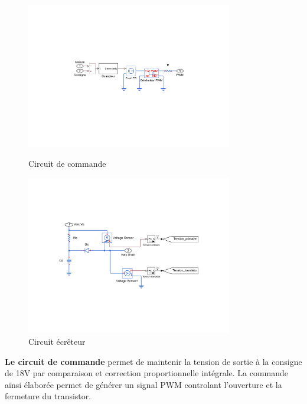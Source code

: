 \documentclass[12pt]{article}
\begin{document}
\vspace{10pt}
\begin{figure}[!h]
  \hspace{-30pt}
  \vspace{-30pt}
  \begin{minipage}[b]{0.45\linewidth}
   \centering
   \includegraphics[width=9cm,trim=6cm 7cm 6cm 7cm, clip=true]{Images_rapport/commande}  
   \caption{Circuit de commande}   
  \end{minipage}
\hfill
  \begin{minipage}[b]{0.45\linewidth}
   \centering
   \includegraphics[width=9cm,trim=4cm 6cm 4cm 6cm, clip=true]{Images_rapport/ecreteur}  
   \caption{Circuit écrêteur}   
  \end{minipage}
\end{figure}

\vspace{10pt}
\newpage
\textbf{Le circuit de commande} permet de maintenir la tension de sortie à la consigne de 18V par comparaison et correction proportionnelle intégrale. La commande ainsi élaborée permet de générer un signal PWM controlant l'ouverture et la fermeture du transistor.\par 
\vspace{10pt}
\end{document}
